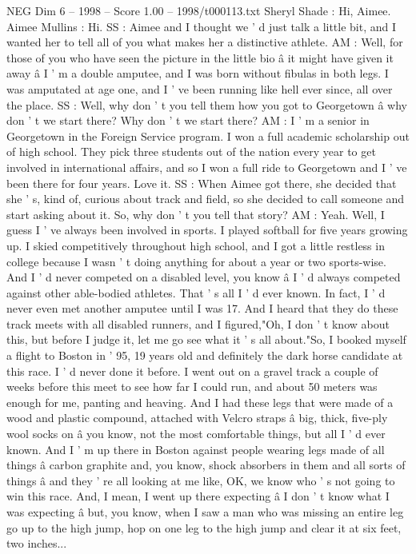 \begin{textsample}{NEG Dim 6 – 1998 – Score 1.00 – 1998/t000113.txt}  \label{ex:f6_neg_063}
Sheryl Shade : Hi, Aimee.
Aimee Mullins : Hi.
SS : Aimee and I thought we ' d just talk a little bit, and I wanted her to tell all of you what makes her a distinctive athlete.
AM : Well, for those of you who have seen the picture in the little bio â it might have given it away â I ' m a double amputee, and I was born without fibulas in both legs.
I was amputated at age one, and I ' ve been running like hell ever since, all over the place.
SS : Well, why don ' t you tell them how you got to Georgetown â why don ' t we start there?
Why don ' t we start there?
AM : I ' m a senior in Georgetown in the Foreign Service program.
I won a full academic scholarship out of high school.
They pick three students out of the nation every year to get involved in international affairs, and so I won a full ride to Georgetown and I ' ve been there for four years.
Love it.
SS : When Aimee got there, she decided that she ' s, kind of, curious about track and field, so she decided to call someone and start asking about it.
So, why don ' t you tell that story?
AM : Yeah.
Well, I guess I ' ve always been involved in sports.
I played softball for five years growing up.
I skied competitively throughout high school, and I got a little restless in college because I wasn ' t doing anything for about a year or two sports-wise.
And I ' d never competed on a disabled level, you know â I ' d always competed against other able-bodied athletes.
That ' s all I ' d ever known.
In fact, I ' d never even met another amputee until I was 17.
And I heard that they do these track meets with all disabled runners, and I figured,"Oh, I don ' t know about this, but before I judge it, let me go see what it ' s all about."So, I booked myself a flight to Boston in ' 95, 19 years old and definitely the dark horse candidate at this race.
I ' d never done it before.
I went out on a gravel track a couple of weeks before this meet to see how far I could run, and about 50 meters was enough for me, panting and heaving.
And I had these legs that were made of a wood and plastic compound, attached with Velcro straps â big, thick, five-ply wool socks on â you know, not the most comfortable things, but all I ' d ever known.
And I ' m up there in Boston against people wearing legs made of all things â carbon graphite and, you know, shock absorbers in them and all sorts of things â and they ' re all looking at me like, OK, we know who ' s not going to win this race.
And, I mean, I went up there expecting â I don ' t know what I was expecting â but, you know, when I saw a man who was missing an entire leg go up to the high jump, hop on one leg to the high jump and clear it at six feet, two inches...

\end{textsample}
